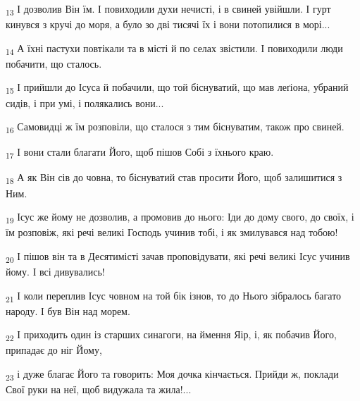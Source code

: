 \begin{tcolorbox}
\textsubscript{13} І дозволив Він їм. І повиходили духи нечисті, і в свиней увійшли. І гурт кинувся з кручі до моря, а було зо дві тисячі їх і вони потопилися в морі...
\end{tcolorbox}
\begin{tcolorbox}
\textsubscript{14} А їхні пастухи повтікали та в місті й по селах звістили. І повиходили люди побачити, що сталось.
\end{tcolorbox}
\begin{tcolorbox}
\textsubscript{15} І прийшли до Ісуса й побачили, що той біснуватий, що мав леґіона, убраний сидів, і при умі, і полякались вони...
\end{tcolorbox}
\begin{tcolorbox}
\textsubscript{16} Самовидці ж їм розповіли, що сталося з тим біснуватим, також про свиней.
\end{tcolorbox}
\begin{tcolorbox}
\textsubscript{17} І вони стали благати Його, щоб пішов Собі з їхнього краю.
\end{tcolorbox}
\begin{tcolorbox}
\textsubscript{18} А як Він сів до човна, то біснуватий став просити Його, щоб залишитися з Ним.
\end{tcolorbox}
\begin{tcolorbox}
\textsubscript{19} Ісус же йому не дозволив, а промовив до нього: Іди до дому свого, до своїх, і їм розповіж, які речі великі Господь учинив тобі, і як змилувався над тобою!
\end{tcolorbox}
\begin{tcolorbox}
\textsubscript{20} І пішов він та в Десятимісті зачав проповідувати, які речі великі Ісус учинив йому. І всі дивувались!
\end{tcolorbox}
\begin{tcolorbox}
\textsubscript{21} І коли переплив Ісус човном на той бік ізнов, то до Нього зібралось багато народу. І був Він над морем.
\end{tcolorbox}
\begin{tcolorbox}
\textsubscript{22} І приходить один із старших синагоги, на ймення Яір, і, як побачив Його, припадає до ніг Йому,
\end{tcolorbox}
\begin{tcolorbox}
\textsubscript{23} і дуже благає Його та говорить: Моя дочка кінчається. Прийди ж, поклади Свої руки на неї, щоб видужала та жила!...
\end{tcolorbox}
